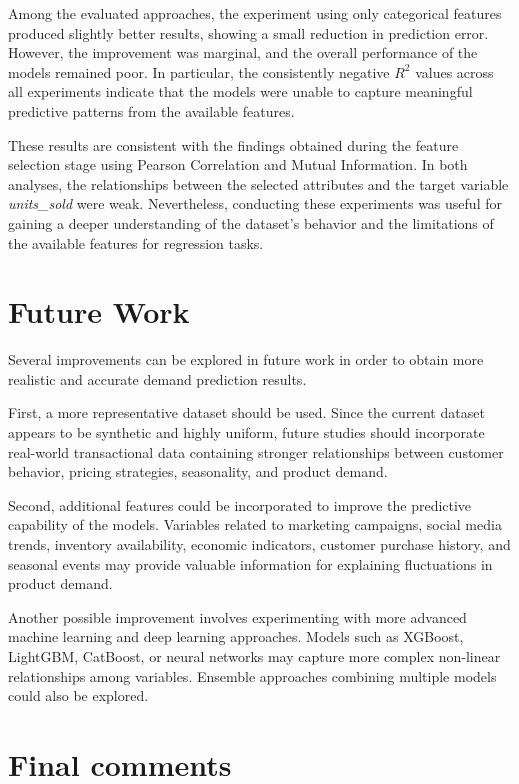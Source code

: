 \documentclass[12pt]{article}
\begin{document}
Among the evaluated approaches, the experiment using only categorical features produced slightly better results, showing a small reduction in prediction error. However, the improvement was marginal, and the overall performance of the models remained poor. In particular, the consistently negative $R^2$ values across all experiments indicate that the models were unable to capture meaningful predictive patterns from the available features.

These results are consistent with the findings obtained during the feature selection stage using Pearson Correlation and Mutual Information. In both analyses, the relationships between the selected attributes and the target variable \textit{units\_sold} were weak. Nevertheless, conducting these experiments was useful for gaining a deeper understanding of the dataset’s behavior and the limitations of the available features for regression tasks.

\section{Future Work}

Several improvements can be explored in future work in order to obtain more realistic and accurate demand prediction results.

First, a more representative dataset should be used. Since the current dataset appears to be synthetic and highly uniform, future studies should incorporate real-world transactional data containing stronger relationships between customer behavior, pricing strategies, seasonality, and product demand.

Second, additional features could be incorporated to improve the predictive capability of the models. Variables related to marketing campaigns, social media trends, inventory availability, economic indicators, customer purchase history, and seasonal events may provide valuable information for explaining fluctuations in product demand.

Another possible improvement involves experimenting with more advanced machine learning and deep learning approaches. Models such as XGBoost, LightGBM, CatBoost, or neural networks may capture more complex non-linear relationships among variables. Ensemble approaches combining multiple models could also be explored.


\section{Final comments}
\end{document}
